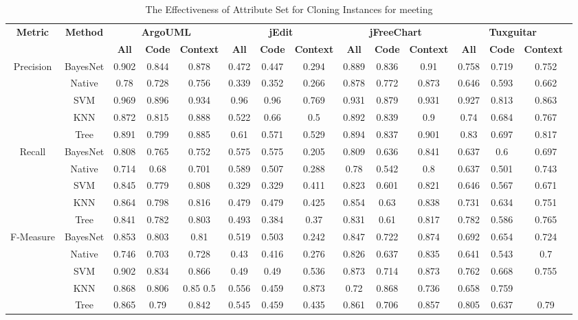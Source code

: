 \begin{table*}[ht]
\scriptsize
\caption{The Effectiveness of Attribute Set for Cloning Instances for meeting}
\label{cloningsetmeeting}
\centering
\begin{tabular}{|c|c|c|c|c|c|c|c|c|c|c|c|c|c|}
\hline
\multirow{2}{*}{\textbf{Metric}}&\multirow{2}{*}{\textbf{Method}}&\multicolumn{3}{|c|}{\textbf{ArgoUML}}&\multicolumn{3}{|c|}{\textbf{jEdit}}&\multicolumn{3}{|c|}{\textbf{jFreeChart}}&\multicolumn{3}{|c|}{\textbf{Tuxguitar}}\\
\cline{3-14}
&&\textbf{All}&\textbf{Code}&\textbf{Context}&\textbf{All}&\textbf{Code}&\textbf{Context}&\textbf{All}&\textbf{Code}&\textbf{Context}&\textbf{All}&\textbf{Code}&\textbf{Context}~\\
\hline
\multirow{5}{*}{Precision}
&BayesNet&	0.902	&0.844	&0.878	&	0.472	&0.447	&0.294	&	0.889	&0.836	&0.91	&	0.758	&0.719	&0.752\\
&Native&	0.78&	0.728&	0.756	&	0.339	&0.352	&0.266	&	0.878	&0.772	&0.873	&	0.646	&0.593	&0.662\\
&SVM&	0.969	&0.896	&0.934	&	0.96	&0.96&	0.769	&	0.931	&0.879	&0.931	&	0.927&	0.813	&0.863\\
&KNN&	0.872	&0.815	&0.888		&0.522	&0.66	&0.5		&0.892	&0.839	&0.9	&	0.74&	0.684	&0.767\\
&Tree&	0.891	&0.799&	0.885	&	0.61	&0.571	&0.529	&	0.894	&0.837&	0.901	&	0.83	&0.697	&0.817\\
\hline
\multirow{5}{*}{Recall}
&BayesNet&	0.808	&0.765&	0.752		&0.575	&0.575	&0.205	&	0.809&	0.636&	0.841	&	0.637&	0.6	&0.697\\
&Native&	0.714&	0.68	&0.701	&	0.589	&0.507&	0.288		&0.78	&0.542	&0.8	&	0.637	&0.501	&0.743\\
&SVM&	0.845&	0.779	&0.808	&	0.329	&0.329&	0.411	&	0.823	&0.601&	0.821	&	0.646	&0.567	&0.671\\
&KNN&	0.864&	0.798	&0.816	&	0.479	&0.479&	0.425	&	0.854&	0.63&	0.838		&0.731	&0.634&	0.751\\
&Tree&	0.841&	0.782	&0.803	&	0.493	&0.384&	0.37	&	0.831&	0.61&	0.817	&	0.782	&0.586	&0.765\\
\hline
\multirow{5}{*}{F-Measure}
&BayesNet&	0.853&	0.803&	0.81	&	0.519	&0.503&	0.242	&	0.847&	0.722&	0.874	&	0.692&	0.654&	0.724\\
&Native&	0.746&	0.703	&0.728		&0.43	&0.416	&0.276	&	0.826	&0.637	&0.835		&0.641	&0.543	&0.7\\
&SVM&	0.902&	0.834&	0.866&		0.49&	0.49	&0.536	&	0.873&	0.714	&0.873	&	0.762	&0.668&	0.755\\
&KNN&	0.868&	0.806&	0.85		0.5&	0.556	&0.459		&0.873	&0.72	&0.868		&0.736&	0.658	&0.759\\
&Tree&	0.865&	0.79&	0.842	&	0.545&	0.459&	0.435	&	0.861	&0.706&	0.857	&	0.805	&0.637&	0.79\\
\hline
\end{tabular}
\end{table*}

